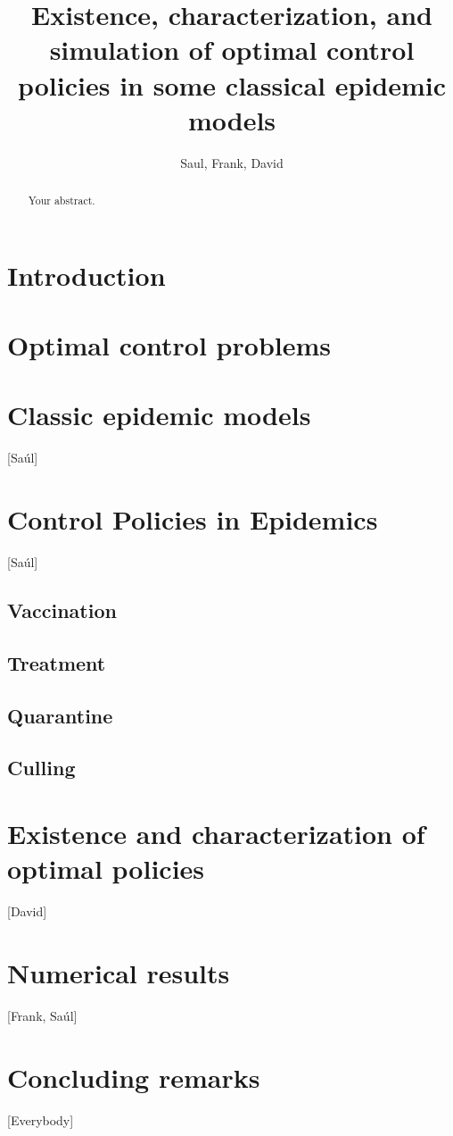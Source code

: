 \documentclass[a4paper]{article}
\title{
	Existence, characterization, and simulation
	of optimal control policies in some classical epidemic models
}
\author{Saul, Frank, David}
\begin{document}
\maketitle

\begin{abstract}
	Your abstract.
\end{abstract}

\section{Introduction}

\section{Optimal control problems}

	


\section{Classic epidemic models}
[Saúl]



\section{Control Policies in Epidemics}
	[Saúl]
    	
    \subsection{Vaccination}
    	
    \subsection{Treatment}
    	
    \subsection{Quarantine}
    	
    \subsection{Culling}
    	


\section{Existence and characterization of optimal policies}
[David]

\section{Numerical results}
[Frank, Saúl]

\section{Concluding remarks}
[Everybody]



\end{document}
